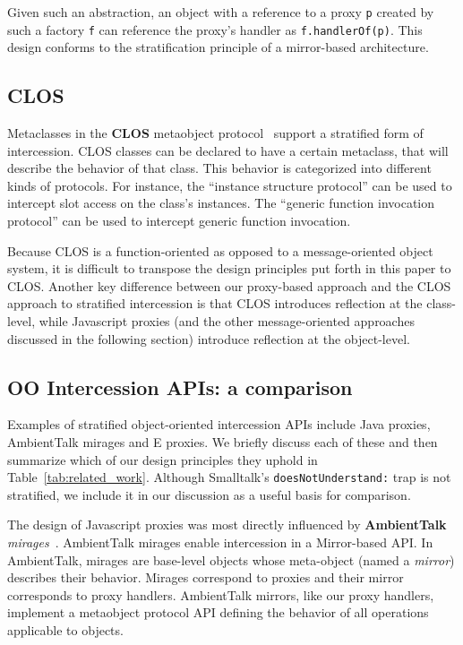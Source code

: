 \documentclass{acm_proc_article-sp}
\begin{document}
Given such an abstraction, an object with a reference to a proxy \texttt{p} created by such a factory \texttt{f} can reference the proxy's handler as \texttt{f.handlerOf(p)}. This design conforms to the stratification principle of a mirror-based architecture.

\subsection{CLOS}

Metaclasses in the \textbf{CLOS} metaobject protocol~\cite{clos} support a stratified form of intercession. CLOS classes can be declared to have a certain metaclass, that will describe the behavior of that class. This behavior is categorized into different kinds of protocols. For instance, the ``instance structure protocol'' can be used to intercept slot access on the class's instances. The ``generic function invocation protocol'' can be used to intercept generic function invocation.

Because CLOS is a function-oriented as opposed to a message-oriented object system, it is difficult to transpose the design principles put forth in this paper to CLOS. Another key difference between our proxy-based approach and the CLOS approach to stratified intercession is that CLOS introduces reflection at the class-level, while Javascript proxies (and the other message-oriented approaches discussed in the following section) introduce reflection at the object-level.

\subsection{OO Intercession APIs: a comparison}

Examples of stratified object-oriented intercession APIs include Java proxies, AmbientTalk mirages and E proxies. We briefly discuss each of these and then summarize which of our design principles they uphold in Table~\ref{tab:related_work}. Although Smalltalk's \texttt{doesNotUnderstand:} trap is not stratified,  we include it in our discussion as a useful basis for comparison.

The design of Javascript proxies was most directly influenced by \textbf{AmbientTalk} \emph{mirages}~\cite{mirages_dls_07,spe_journal_08}. AmbientTalk mirages enable intercession in a Mirror-based API. In AmbientTalk, mirages are base-level objects whose meta-object (named a \emph{mirror}) describes their behavior. Mirages correspond to proxies and their mirror corresponds to proxy handlers. AmbientTalk mirrors, like our proxy handlers, implement a metaobject protocol API defining the behavior of all operations applicable to objects.
\end{document}
